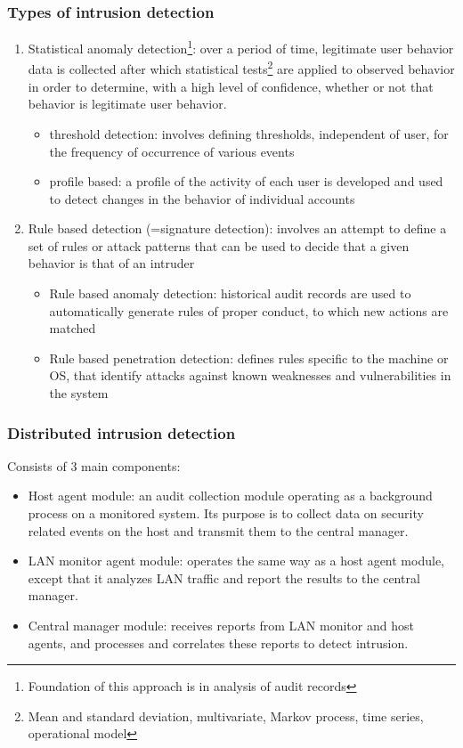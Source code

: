 \documentclass[12pt]{article}
\begin{document}
 \subsubsection{Types of intrusion detection}
 \begin{enumerate}
 	\item Statistical anomaly detection\footnote{Foundation of this approach is in analysis of audit records}: over a period of time, legitimate user behavior data is collected after which statistical tests\footnote{Mean and standard deviation, multivariate, Markov process, time series, operational model} are applied to observed behavior in order to determine, with a high level of confidence, whether or not that behavior is legitimate user behavior.
 	\begin{itemize}
 		\item threshold detection: involves defining thresholds, independent of user, for the frequency of occurrence of various events
 		\item profile based: a profile of the activity of each user is developed and used to detect changes in the behavior of individual accounts
 	\end{itemize}
 	\item Rule based detection (=signature detection): involves an attempt to define a set of rules or attack patterns that can be used to decide that a given behavior is that of an intruder
 	\begin{itemize}
 		\item Rule based anomaly detection: historical audit records are used to automatically generate rules of proper conduct, to which new actions are matched
 		\item Rule based penetration detection: defines rules specific to the machine or OS, that identify attacks against known weaknesses and vulnerabilities in the system
 	\end{itemize}
 \end{enumerate}
 
 \subsubsection{Distributed intrusion detection}
 Consists of 3 main components:
 \begin{itemize}
 	\item Host agent module: an audit collection module operating as a background process on a monitored system. Its purpose is to collect data on security related events on the host and transmit them to the central manager.
 	\item LAN monitor agent module: operates the same way as a host agent module, except that it analyzes LAN traffic and report the results to the central manager.
 	\item Central manager module: receives reports from LAN monitor and host agents, and processes and correlates these reports to detect intrusion.
 \end{itemize}
 
\end{document}
